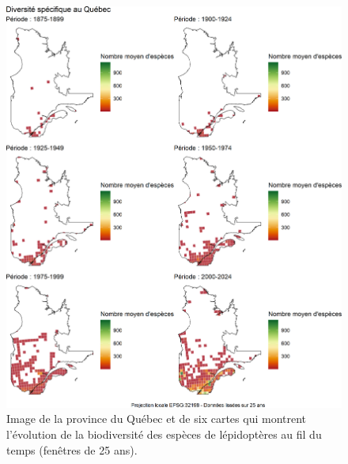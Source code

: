 \documentclass[9pt,twocolumn,twoside,]{pnas-new}
\begin{document}
\begin{figure}

\includegraphics[width=1\linewidth]{cartes_combinees} \hfill{}

\caption{Image de la province du Québec et de six cartes qui montrent l'évolution de la biodiversité des espèces de lépidoptères au fil du temps (fenêtres de 25 ans).}\label{fig:fig_cartes_combinees, fullpage-figure}
\end{figure}
\end{document}
